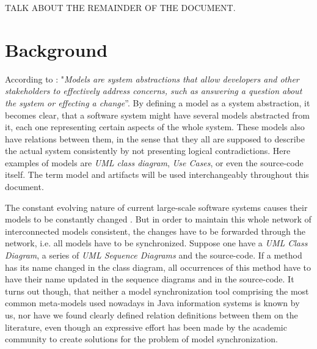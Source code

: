 \documentclass[tuberlin,cic,tc,english,noabntcite]{iiufrgs}
\begin{document}
TALK ABOUT THE REMAINDER OF THE DOCUMENT.

\section{Background}
According to \citet[p. 21]{czarnecki2006feature}: "\textit{Models are system abstractions that allow developers and other stakeholders to effectively address concerns, such as answering a question about the system or effecting a change}”. By defining a model as a system abstraction, it becomes clear, that a software system might have several models abstracted from it, each one representing certain aspects of the whole system. These models also have relations between them, in the sense that they all are supposed to describe the actual system consistently by not presenting logical contradictions. Here examples of models are \emph{UML class diagram}, \emph{Use Cases}, or even the source-code itself. The term model and artifacts will be used interchangeably throughout this document.

The constant evolving nature of current large-scale software systems causes their models to be constantly changed \citep{diskin2011model}. But in order to maintain this whole network of interconnected models consistent, the changes have to be forwarded through the network, i.e. all models have to be synchronized. Suppose one have a \emph{UML Class Diagram}, a series of \emph{UML Sequence Diagrams} and the source-code. If a method has its name changed in the class diagram, all occurrences of this method have to have their name updated in the sequence diagrams and in the source-code. It turns out though, that neither a model synchronization tool comprising the most common meta-models used nowadays in Java information systems is known by us, nor have we found clearly defined relation definitions between them on the literature, even though an expressive effort has been made by the academic community to create solutions for the problem of model synchronization. 

\end{document}
